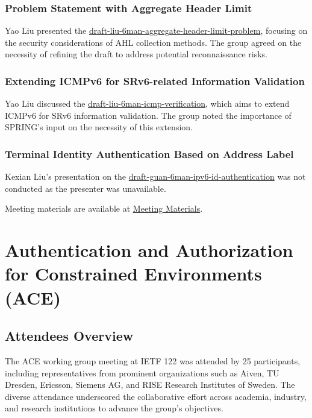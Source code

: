 \documentclass{article}
\begin{document}
\subsubsection{Problem Statement with Aggregate Header Limit}
Yao Liu presented the \href{https://datatracker.ietf.org/doc/html/draft-liu-6man-aggregate-header-limit-problem}{draft-liu-6man-aggregate-header-limit-problem}, focusing on the security considerations of AHL collection methods. The group agreed on the necessity of refining the draft to address potential reconnaissance risks.

\subsubsection{Extending ICMPv6 for SRv6-related Information Validation}
Yao Liu discussed the \href{https://datatracker.ietf.org/doc/html/draft-liu-6man-icmp-verification}{draft-liu-6man-icmp-verification}, which aims to extend ICMPv6 for SRv6 information validation. The group noted the importance of SPRING's input on the necessity of this extension.

\subsubsection{Terminal Identity Authentication Based on Address Label}
Kexian Liu's presentation on the \href{https://datatracker.ietf.org/doc/html/draft-guan-6man-ipv6-id-authentication}{draft-guan-6man-ipv6-id-authentication} was not conducted as the presenter was unavailable.

Meeting materials are available at \href{https://datatracker.ietf.org/meeting/122/materials/agenda-122-6man}{Meeting Materials}.



\newpage

\section{Authentication and Authorization for Constrained Environments (ACE)}

\subsection{Attendees Overview}

The ACE working group meeting at IETF 122 was attended by 25 participants, including representatives from prominent organizations such as Aiven, TU Dresden, Ericsson, Siemens AG, and RISE Research Institutes of Sweden. The diverse attendance underscored the collaborative effort across academia, industry, and research institutions to advance the group's objectives.
\end{document}
